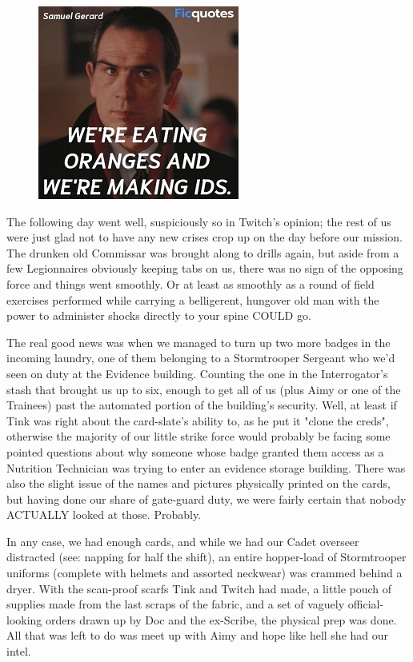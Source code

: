\begin{figure}
	\begin{center}
		\includegraphics[width=\figwidth]{pics/21/41.png}
	\end{center}
\end{figure}
The following day went well, suspiciously so in Twitch's opinion; 
the rest of us were just glad not to have any new crises crop up on the day before our mission. 
The drunken old Commissar was brought along to drills again, but aside from a few Legionnaires obviously keeping tabs on us, there was no sign of the opposing force and things went smoothly. 
Or at least as smoothly as a round of field exercises performed while carrying a belligerent, hungover old man with the power to administer shocks directly to your spine COULD go. 


The real good news was when we managed to turn up two more badges in the incoming laundry, one of them belonging to a Stormtrooper Sergeant who we'd seen on duty at the Evidence building. 
Counting the one in the Interrogator's stash that brought us up to six, enough to get all of us (plus Aimy or one of the Trainees) past the automated portion of the building's security. 
Well, at least if Tink was right about the card-slate's ability to, as he put it "clone the creds", otherwise the majority of our little strike force would probably be facing some pointed questions about why someone whose badge granted them access as a Nutrition Technician was trying to enter an evidence storage building. 
There was also the slight issue of the names and pictures physically printed on the cards, but having done our share of gate-guard duty, we were fairly certain that nobody ACTUALLY looked at those. 
Probably.

In any case, we had enough cards, and while we had our Cadet overseer distracted (see: 
napping for half the shift), an entire hopper-load of Stormtrooper uniforms (complete with helmets and assorted neckwear) was crammed behind a dryer. 
With the scan-proof scarfs Tink and Twitch had made, a little pouch of supplies made from the last scraps of the fabric, and a set of vaguely official-looking orders drawn up by Doc and the ex-Scribe, the physical prep was done. 
All that was left to do was meet up with Aimy and hope like hell she had our intel.


